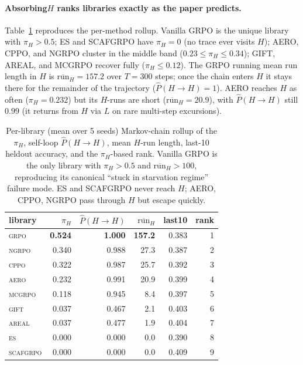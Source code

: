 \paragraph{Absorbing$H$ ranks libraries exactly as the paper predicts.}
Table~\ref{tab:zvf-iter74-library-summary} reproduces the per-method
rollup. Vanilla \textsc{GRPO} is the unique library with
$\pi_H > 0.5$; \textsc{ES} and \textsc{SCAFGRPO} have
$\pi_H = 0$ (no trace ever visits $H$); \textsc{AERO}, \textsc{CPPO},
and \textsc{NGRPO} cluster in the middle band
($0.23 \le \pi_H \le 0.34$); \textsc{GIFT}, \textsc{AREAL},
and \textsc{MCGRPO} recover fully ($\pi_H \le 0.12$). The
\textsc{GRPO} running mean run length in $H$ is $\overline{\mathrm{run}}_H = 157.2$
over $T=300$ steps; once the chain enters $H$ it stays there for
the remainder of the trajectory ($\hat P(H \to H) = 1$). \textsc{AERO}
reaches $H$ as often ($\pi_H = 0.232$) but its $H$-runs are short
($\overline{\mathrm{run}}_H = 20.9$), with $\hat P(H \to H)$ still
$0.99$ (it returns from $H$ via $L$ on rare multi-step excursions).

\begin{table}[htbp]
\centering\small\setlength{\tabcolsep}{4pt}
\begin{tabular}{lrrrrr}
\hline
library & $\pi_H$ & $\hat P(H\!\to\!H)$ & $\overline{\mathrm{run}}_H$ & last10 & rank \\
\hline
\textsc{grpo}     & \textbf{0.524} & \textbf{1.000} & \textbf{157.2} & 0.383 & 1 \\
\textsc{ngrpo}    & 0.340 & 0.988 & 27.3 & 0.387 & 2 \\
\textsc{cppo}     & 0.322 & 0.987 & 25.7 & 0.392 & 3 \\
\textsc{aero}     & 0.232 & 0.991 & 20.9 & 0.399 & 4 \\
\textsc{mcgrpo}   & 0.118 & 0.945 & 8.4  & 0.397 & 5 \\
\textsc{gift}     & 0.037 & 0.467 & 2.1  & 0.403 & 6 \\
\textsc{areal}    & 0.037 & 0.477 & 1.9  & 0.404 & 7 \\
\textsc{es}       & 0.000 & 0.000 & 0.0  & 0.390 & 8 \\
\textsc{scafgrpo} & 0.000 & 0.000 & 0.0  & 0.409 & 9 \\
\hline
\end{tabular}
\caption{Per-library (mean over 5 seeds) Markov-chain rollup of the
$\pi_H$, self-loop $\hat P(H \to H)$, mean $H$-run length,
last-10 heldout accuracy, and the $\pi_H$-based rank. Vanilla
\textsc{GRPO} is the only library with $\pi_H > 0.5$ and
$\overline{\mathrm{run}}_H > 100$, reproducing its canonical
``stuck in starvation regime'' failure mode. \textsc{ES} and
\textsc{SCAFGRPO} never reach $H$; \textsc{AERO}, \textsc{CPPO},
\textsc{NGRPO} pass through $H$ but escape quickly.}
\label{tab:zvf-iter74-library-summary}
\end{table}

